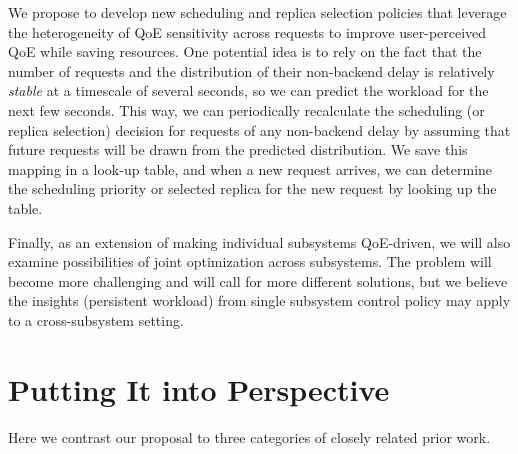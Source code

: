 

We propose to develop new scheduling and replica selection policies that leverage the heterogeneity of QoE sensitivity across requests to improve user-perceived QoE while saving resources. 
One potential idea is to rely on the fact that the number of requests and the distribution of their non-backend delay is relatively {\em stable} at a timescale of several seconds, so we can predict the workload for the next few seconds.
This way, we can periodically recalculate the scheduling (or replica selection) decision for requests of any non-backend delay by assuming that future requests will be drawn from the predicted distribution.
We save this mapping in a look-up table, and when a new request arrives, we can determine the scheduling priority or selected replica for the new request by looking up the table.

Finally, as an extension of making individual subsystems QoE-driven, we will also examine possibilities of joint optimization across subsystems. The problem will become more challenging and will call for more different solutions, but we believe the insights (\eg persistent workload) from single subsystem control policy may apply to a cross-subsystem setting.











\section{Putting It into Perspective}
Here we contrast our proposal to three categories of closely related prior work.

